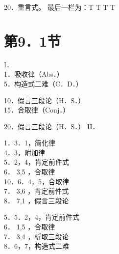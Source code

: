20．重言式。 最后一栏为：T T T T

\section*{第9．1节}
I．\\
1．吸收律（Abs．）\\
5．构造式二难（C．D．）

10．假言三段论（H．S．）\\
15．合取律（Conj．）

20．假言三段论（H．S．） II．

1．3．1，简化律\\
4．3，附加律\\
5．2，4，肯定前件式\\
6． 3,5 ，合取律\\
10．6．4，5，合取律\\
7． 3,6 ，肯定前件式\\
8． 7,1 ，假言三段论

5．5．2，4，肯定前件式\\
6． 1,5 ，合取律\\
7． 3,4 ，析取三段论\\
8．6，7，构造式二难

